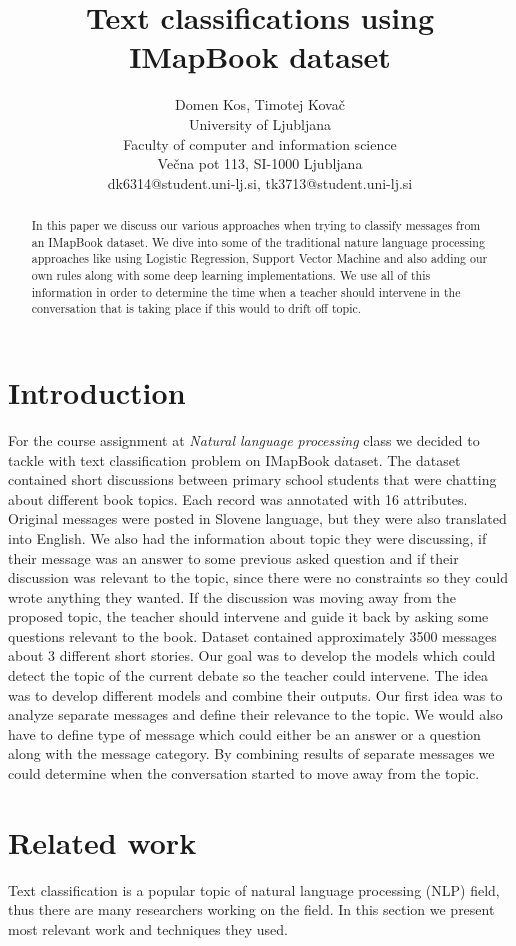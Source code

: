 \documentclass[11pt,a4paper]{article}
\title{Text classifications using IMapBook dataset}
\author{
 Domen Kos, Timotej Kovač \\
 University of Ljubljana \\
 Faculty of computer and information science \\
 Večna pot 113, SI-1000 Ljubljana \\
  {\sf dk6314@student.uni-lj.si, tk3713@student.uni-lj.si} \\
}
\date{}
\begin{document}
\maketitle
 \begin{abstract}
In this paper we discuss our various approaches when trying to classify messages from an IMapBook dataset.
We dive into some of the traditional nature language processing approaches like using Logistic Regression, Support Vector Machine and also adding our own rules along with some deep learning implementations.
We use all of this information in order to determine the time when a teacher should intervene in the conversation that is taking place if this would to drift off topic.
 \end{abstract}


\section{Introduction}
For the course assignment at \textit{Natural language processing} class we decided to tackle with text classification problem on IMapBook dataset.
The dataset contained short discussions between primary school students that were chatting about different book topics.
Each record was annotated with 16 attributes.
Original messages were posted in Slovene language, but they were also translated into English.
We also had the information about topic they were discussing, if their message was an answer to some previous asked question and if their discussion was relevant to the topic, since there were no constraints so they could wrote anything they wanted.
If the discussion was moving away from the proposed topic, the teacher should intervene and guide it back by asking some questions relevant to the book.
Dataset contained approximately 3500 messages about 3 different short stories.
Our goal was to develop the models which could detect the topic of the current debate so the teacher could intervene.
The idea was to develop different models and combine their outputs.
Our first idea was to analyze separate messages and define their relevance to the topic.
We would also have to define type of message which could either be an answer or a question along with the message category.
By combining results of separate messages we could determine when the conversation started to move away from the topic.

\section{Related work}
Text classification is a popular topic of natural language processing (NLP) field, thus there are many researchers working on the field. 
In this section we present most relevant work and techniques they used.
\end{document}
